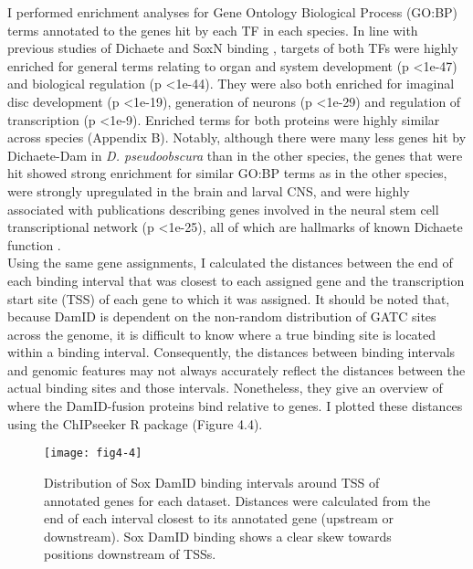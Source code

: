 I performed enrichment analyses for Gene Ontology Biological Process (GO:BP) terms annotated to the genes hit by each TF in each species. In line with previous studies of Dichaete and SoxN binding \citep{aleksic_role_2013,ferrero_soxneuro_2014}, targets of both TFs were highly enriched for general terms relating to organ and system development (p \textless 1e-47) and biological regulation (p \textless 1e-44). They were also both enriched for imaginal disc development (p \textless 1e-19), generation of neurons (p \textless 1e-29) and regulation of transcription (p \textless 1e-9). Enriched terms for both proteins were highly similar across species (Appendix B). Notably, although there were many less genes hit by Dichaete-Dam in \emph{D. pseudoobscura} than in the other species, the genes that were hit showed strong enrichment for similar GO:BP terms as in the other species, were strongly upregulated in the brain and larval CNS, and were highly associated with publications describing genes involved in the neural stem cell transcriptional network (p \textless 1e-25), all of which are hallmarks of known Dichaete function \citep{aleksic_role_2013,shen_identifying_2013,soriano_drosophila_1998}.\\ 

Using the same gene assignments, I calculated the distances between the end of each binding interval that was closest to each assigned gene and the transcription start site (TSS) of each gene to which it was assigned. It should be noted that, because DamID is dependent on the non-random distribution of GATC sites across the genome, it is difficult to know where a true binding site is located within a binding interval. Consequently, the distances between binding intervals and genomic features may not always accurately reflect the distances between the actual binding sites and those intervals. Nonetheless, they give an overview of where the DamID-fusion proteins bind relative to genes. I plotted these distances using the ChIPseeker R package \citep{yu_chipseeker_2014} (Figure 4.4).\\ 

\begin{figure}
\centering
\texttt{[image: fig4-4]}
\caption{Distribution of Sox DamID binding intervals around TSS of annotated genes for each dataset. Distances were calculated from the end of each interval closest to its annotated gene (upstream or downstream). Sox DamID binding shows a clear skew towards positions downstream of TSSs.}
\label{Figure 4.4}
\end{figure}

